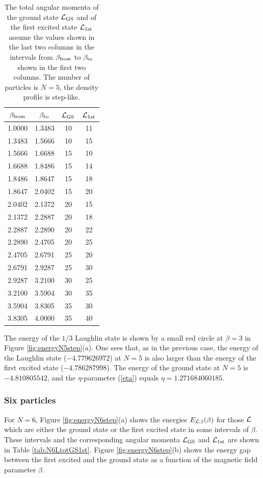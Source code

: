 \documentclass[aps,prb,10pt%
]{revtex4-2}
\begin{document}
\begin{table}[!ht]
\caption{The total angular momenta of the ground state ${\cal L}_{\rm GS}$ and of the first excited state ${\cal L}_{\rm 1st}$ assume the values shown in the last two columns in the intervals from $\beta_{\rm from}$ to $\beta_{\rm to}$ shown in the first two columns. The number of particles is  $N=5$, the density profile is step-like. \label{tab:N5LtotGS1st}}
\begin{tabular}{cccc}
$\beta_{\rm from}$ & $\beta_{\rm to}$   & ${\cal L}_{\rm GS}$   & ${\cal L}_{\rm 1st}$\\
\hline
1.0000	& 1.3483	& 10	& 11 \\
1.3483	& 1.5666	& 10	& 15 \\
1.5666	& 1.6688	& 15	& 10 \\
1.6688	& 1.8486	& 15	& 14 \\
1.8486	& 1.8647	& 15	& 18 \\
1.8647	& 2.0402	& 15	& 20 \\
2.0402	& 2.1372	& 20	& 15 \\
2.1372	& 2.2887	& 20	& 18 \\
2.2887	& 2.2890	& 20	& 22 \\
2.2890	& 2.4705	& 20	& 25 \\
2.4705	& 2.6791	& 25	& 20 \\
2.6791	& 2.9287	& 25	& 30 \\
2.9287	& 3.2100	& 30	& 25 \\
3.2100	& 3.5904	& 30	& 35 \\
3.5904	& 3.8305	& 35	& 30 \\
3.8305	& 4.0000	& 35	& 40 \\
\end{tabular}
\end{table}

The energy of the $1/3$ Laughlin state is shown by a small red circle at $\beta=3$ in Figure \ref{fig:energyN5step}(a). One sees that, as in the previous case, the energy of the Laughlin state ($-4.779626972$) at $N=5$ is also larger than the energy of the first excited state  ($-4.786287998$). The energy of the ground state at $N=5$ is $-4.810805542$, and the $\eta$-parameter (\ref{eta}) equals $\eta=1.271684060185$.


\subsubsection{Six particles}

For $N=6$, Figure \ref{fig:energyN6step}(a) shows the energies $E_{{\cal L},1}(\beta)$ for those ${\cal L}$ which are either the ground state or the first excited state in some intervals of $\beta$. These intervals and the corresponding angular momenta ${\cal L}_{\rm GS}$ and ${\cal L}_{\rm 1st}$ are shown in Table \ref{tab:N6LtotGS1st}. Figure \ref{fig:energyN6step}(b) shows the energy gap between the first excited and the ground state as a function of the magnetic field parameter $\beta$. 
\end{document}
